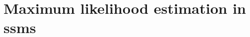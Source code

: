 \section{Maximum likelihood estimation in \texorpdfstring{\glspl{ssm}}{state space models}}
\label{sec:maximum_likelihood_estimation}
